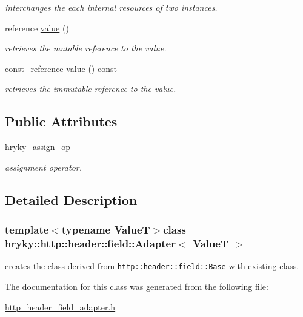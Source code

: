 \begin{DoxyCompactItemize}
\begin{DoxyCompactList}\small\item\em interchanges the each internal resources of two instances. \end{DoxyCompactList}\item 
\hypertarget{classhryky_1_1_adapter_ab736ecd30f215ca3cbd2364f818cb83f}{reference \hyperlink{classhryky_1_1_adapter_ab736ecd30f215ca3cbd2364f818cb83f}{value} ()}\label{classhryky_1_1_adapter_ab736ecd30f215ca3cbd2364f818cb83f}

\begin{DoxyCompactList}\small\item\em retrieves the mutable reference to the value. \end{DoxyCompactList}\item 
\hypertarget{classhryky_1_1_adapter_a5856f2ee6c0622e153f52fbb6ca6bbe9}{const\-\_\-reference \hyperlink{classhryky_1_1_adapter_a5856f2ee6c0622e153f52fbb6ca6bbe9}{value} () const}\label{classhryky_1_1_adapter_a5856f2ee6c0622e153f52fbb6ca6bbe9}

\begin{DoxyCompactList}\small\item\em retrieves the immutable reference to the value. \end{DoxyCompactList}\end{DoxyCompactItemize}
\subsection*{Public Attributes}
\begin{DoxyCompactItemize}
\item 
\hypertarget{classhryky_1_1_adapter_a764c5fe566545047f3acaf18792e5102}{\hyperlink{classhryky_1_1_adapter_a764c5fe566545047f3acaf18792e5102}{hryky\-\_\-assign\-\_\-op}}\label{classhryky_1_1_adapter_a764c5fe566545047f3acaf18792e5102}

\begin{DoxyCompactList}\small\item\em assignment operator. \end{DoxyCompactList}\end{DoxyCompactItemize}


\subsection{Detailed Description}
\subsubsection*{template$<$typename Value\-T$>$class hryky\-::http\-::header\-::field\-::\-Adapter$<$ Value\-T $>$}

creates the class derived from \href{http::header::field::Base}{\tt http\-::header\-::field\-::\-Base} with existing class. 

The documentation for this class was generated from the following file\-:\begin{DoxyCompactItemize}
\item 
\hyperlink{http__header__field__adapter_8h}{http\-\_\-header\-\_\-field\-\_\-adapter.\-h}\end{DoxyCompactItemize}
